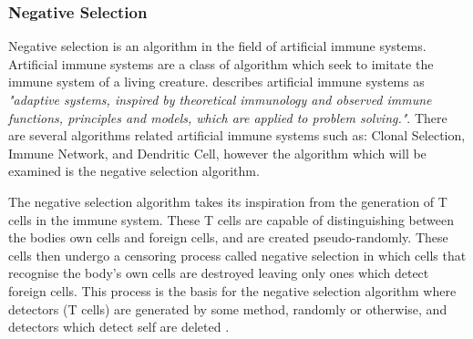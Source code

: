 	\subsubsection{Negative Selection}
	Negative selection is an algorithm in the field of artificial immune systems. Artificial immune systems are a class of algorithm which seek to imitate the immune system of a living creature. \cite{de2002artificial} describes artificial immune systems as \textit{"adaptive systems, inspired by theoretical immunology and observed immune functions, principles and models, which are applied to problem solving."}. There are several algorithms related artificial immune systems such as: Clonal Selection, Immune Network, and Dendritic Cell, however the algorithm which will be examined is the negative selection algorithm. 
	
	The negative selection algorithm takes its inspiration from the generation of T cells in the immune system. These T cells are capable of distinguishing between the bodies own cells and foreign cells, and are created pseudo-randomly. These cells then undergo a censoring process called negative selection in which cells that recognise the body's own cells are destroyed leaving only ones which detect foreign cells. This process is the basis for the negative selection algorithm where detectors (T cells) are generated by some method, randomly or otherwise, and detectors which detect self are deleted \cite{forrest1994self}.
	

